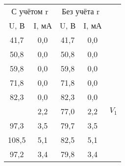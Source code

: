 \begin{table}[!h]
	\begin{minipage}[h]{0.5\linewidth}
	\centering
	\begin{tabular}{|cc|cc|c}
		\cline{1-4}
		\multicolumn{2}{|c|}{С   учётом r}                         & \multicolumn{2}{c|}{Без   учёта r}                        &                                                  \\ \cline{1-4}
		\multicolumn{1}{|c|}{U, В}                         & I, мА & \multicolumn{1}{c|}{U, В}                         & I, мА &                                                  \\ \cline{1-4}
		\multicolumn{1}{|c|}{41,7}                         & 0,0   & \multicolumn{1}{c|}{41,7}                         & 0,0   &                                                  \\ \cline{1-4}
		\multicolumn{1}{|c|}{50,8}                         & 0,0   & \multicolumn{1}{c|}{50,8}                         & 0,0   &                                                  \\ \cline{1-4}
		\multicolumn{1}{|c|}{59,8}                         & 0,0   & \multicolumn{1}{c|}{59,8}                         & 0,0   &                                                  \\ \cline{1-4}
		\multicolumn{1}{|c|}{71,8}                         & 0,0   & \multicolumn{1}{c|}{71,8}                         & 0,0   &                                                  \\ \cline{1-4}
		\multicolumn{1}{|c|}{82,3}                         & 0,0   & \multicolumn{1}{c|}{82,3}                         & 0,0   &                                                  \\ \hline
		\rowcolor[HTML]{F8CBAD} 
		\multicolumn{1}{|c|}{\cellcolor[HTML]{F8CBAD}88,2} & 2,2   & \multicolumn{1}{c|}{\cellcolor[HTML]{F8CBAD}77,0} & 2,2   & \multicolumn{1}{c|}{\cellcolor[HTML]{F8CBAD}$V_1$} \\ \hline
		\multicolumn{1}{|c|}{97,3}                         & 3,5   & \multicolumn{1}{c|}{79,7}                         & 3,5   &                                                  \\ \cline{1-4}
		\multicolumn{1}{|c|}{108,5}                        & 5,1   & \multicolumn{1}{c|}{82,5}                         & 5,1   &                                                  \\ \cline{1-4}
		\multicolumn{1}{|c|}{97,2}                         & 3,4   & \multicolumn{1}{c|}{79,8}                         & 3,4   &                                                  \\ \hline

\end{tabular}
\end{minipage}
\end{table}
